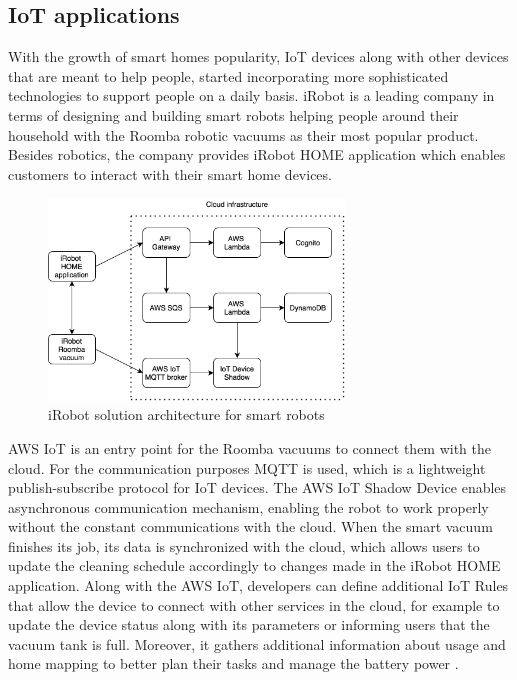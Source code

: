 \subsection{IoT applications}

With the growth of smart homes popularity, IoT devices along with other devices that are meant to help people, started incorporating more sophisticated technologies to support people on a daily basis. iRobot is a leading company in terms of designing and building smart robots helping people around their household with the Roomba robotic vacuums as their most popular product. Besides robotics, the company provides iRobot HOME application which enables customers to interact with their smart home devices.

\begin{figure}[h]
    \centering
    \includegraphics[width=0.7\textwidth]{assets/02-serverless/iRobotArchitecture.png}
    \caption{iRobot solution architecture for smart robots}
    \label{fig:irobot-architecture-diagram}
\end{figure}

AWS IoT is an entry point for the Roomba vacuums to connect them with the cloud. For the communication purposes MQTT is used, which is a lightweight publish-subscribe protocol for IoT devices. The AWS IoT Shadow Device enables asynchronous communication mechanism, enabling the robot to work properly without the constant communications with the cloud. When the smart vacuum finishes its job, its data is synchronized with the cloud, which allows users to update the cleaning schedule accordingly to changes made in the iRobot HOME application. Along with the AWS IoT, developers can define additional IoT Rules that allow the device to connect with other services in the cloud, for example to update the device status along with its parameters or informing users that the vacuum tank is full. Moreover, it gathers additional information about usage and home mapping to better plan their tasks and manage the battery power \cite{ServerlessIoTatiRobot}.

